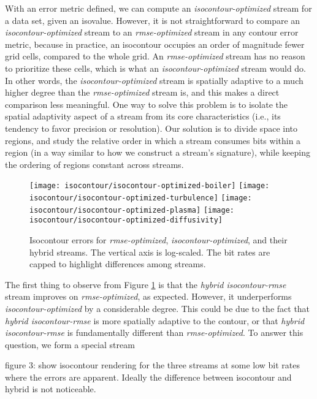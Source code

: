 With an error metric defined, we can compute an \emph{isocontour-optimized} stream for a data set,
given an isovalue. However, it is not straightforward to compare an \emph{isocontour-optimized}
stream to an \emph{rmse-optimized} stream in any contour error metric, because in practice, an
isocontour occupies an order of magnitude fewer grid cells, compared to the whole grid. An
\emph{rmse-optimized} stream has no reason to prioritize these cells, which is what an
\emph{isocontour-optimized} stream would do. In other words, the \emph{isocontour-optimized} stream
is spatially adaptive to a much higher degree than the \emph{rmse-optimized} stream is, and this
makes a direct comparison less meaningful. One way to solve this problem is to isolate the spatial
adaptivity aspect of a stream from its core characteristics (i.e., its tendency to favor precision
or resolution). Our solution is to divide space into regions, and study the relative order in which
a stream consumes bits within a region (in a way similar to how we construct a stream's signature),
while keeping the ordering of regions constant across streams.

\begin{figure}
	\centering
	{\texttt{[image: isocontour/isocontour-optimized-boiler]}}
	{\texttt{[image: isocontour/isocontour-optimized-turbulence]}}
	{\texttt{[image: isocontour/isocontour-optimized-plasma]}}
	{\texttt{[image: isocontour/isocontour-optimized-diffusivity]}}
	\caption{Isocontour errors for \emph{rmse-optimized}, \emph{isocontour-optimized}, and their
	hybrid streams. The vertical axis is log-scaled. The bit rates are capped to highlight differences
	among streams.}
	\label{fig:isocontour-plots}
\end{figure}

The first thing to observe from Figure \ref{fig:isocontour-plots} is that the \emph{hybrid
isocontour-rmse} stream improves on \emph{rmse-optimized}, as expected. However, it underperforms
\emph{isocontour-optimized} by a considerable degree. This could be due to the fact that
\emph{hybrid isocontour-rmse} is more spatially adaptive to the contour, or that \emph{hybrid
isocontour-rmse} is fundamentally different than \emph{rmse-optimized}. To answer this question, we
form a special stream 

figure 3: show isocontour rendering for the three streams at some low bit rates where the errors are
apparent. Ideally the difference between isocontour and hybrid is not noticeable.

